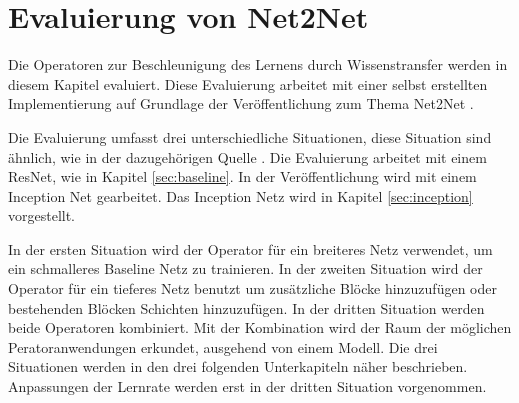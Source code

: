 
\chapter{Evaluierung von Net2Net}\label{sec:net2netexperimente}
Die Operatoren zur Beschleunigung des Lernens durch Wissenstransfer werden in diesem Kapitel evaluiert. Diese Evaluierung arbeitet mit einer selbst erstellten Implementierung auf Grundlage der Veröffentlichung zum Thema Net2Net \cite{net2net}.

Die Evaluierung umfasst drei unterschiedliche Situationen, diese Situation sind ähnlich, wie in der dazugehörigen Quelle \cite{net2net}. Die Evaluierung arbeitet mit einem ResNet, wie in Kapitel \ref{sec:baseline}. In der Veröffentlichung wird mit einem Inception Net gearbeitet. Das Inception Netz wird in Kapitel \ref{sec:inception} vorgestellt.

In der ersten Situation wird der Operator für ein breiteres Netz verwendet, um ein schmalleres Baseline Netz zu trainieren. 
In der zweiten Situation wird der Operator für ein tieferes Netz benutzt um zusätzliche Blöcke hinzuzufügen oder bestehenden Blöcken Schichten hinzuzufügen. In der dritten Situation werden beide Operatoren kombiniert. Mit der Kombination wird der Raum der möglichen Peratoranwendungen erkundet, ausgehend von einem Modell.
Die drei Situationen werden in den drei folgenden Unterkapiteln näher beschrieben. Anpassungen der Lernrate werden erst in der dritten Situation vorgenommen.

